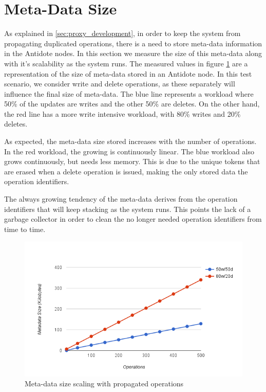 \section{Meta-Data Size}
\label{sec:meta-data_size}
As explained in \ref{sec:proxy_development}, in order to keep the system from propagating duplicated operations, there is a need to store meta-data information in the Antidote nodes. In this section we measure the size of this meta-data along with it's scalability as the system runs. The measured values in figure \ref{chart3} are a representation of the size of meta-data stored in an Antidote node. In this test scenario, we consider write and delete operations, as these separately will influence the final size of meta-data. The blue line represents a workload where 50\% of the updates are writes and the other 50\% are deletes. On the other hand, the red line has a more write intensive workload, with 80\% writes and 20\% deletes.\par
	As expected, the meta-data size stored increases with the number of operations. In the red workload, the growing is continuously linear. The blue workload also grows continuously, but needs less memory. This is due to the unique tokens that are erased when a delete operation is issued, making the only stored data the operation identifiers.\par
	The always growing tendency of the meta-data derives from the operation identifiers that will keep stacking as the system runs. This points the lack of a garbage collector in order to clean the no longer needed operation identifiers from time to time.

\begin{figure}[h]
\centering
\includegraphics[scale=0.7]{files/chart3.png}
\caption{Meta-data size scaling with propagated operations}
\label{chart3}
\end{figure}

